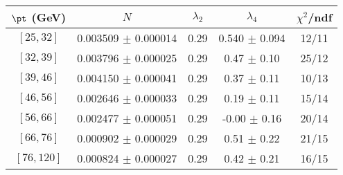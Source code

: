\begin{tabular}{c||c|c|c|c}
$\pt$ (GeV) & $N$ & $\lambda_{2}$ & $\lambda_4$  & $\chi^2$/ndf  \\
\hline
$[25, 32]$ & 0.003509 $\pm$ 0.000014 & 0.29 & 0.540 $\pm$ 0.094 & 12/11\\
$[32, 39]$ & 0.003796 $\pm$ 0.000025 & 0.29 & 0.47 $\pm$ 0.10 & 25/12\\
$[39, 46]$ & 0.004150 $\pm$ 0.000041 & 0.29 & 0.37 $\pm$ 0.11 & 10/13\\
$[46, 56]$ & 0.002646 $\pm$ 0.000033 & 0.29 & 0.19 $\pm$ 0.11 & 15/14\\
$[56, 66]$ & 0.002477 $\pm$ 0.000051 & 0.29 & -0.00 $\pm$ 0.16 & 20/14\\
$[66, 76]$ & 0.000902 $\pm$ 0.000029 & 0.29 & 0.51 $\pm$ 0.22 & 21/15\\
$[76, 120]$ & 0.000824 $\pm$ 0.000027 & 0.29 & 0.42 $\pm$ 0.21 & 16/15\\
\end{tabular}
